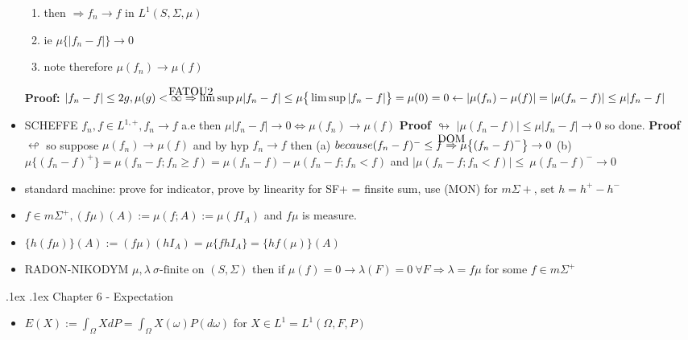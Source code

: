 \documentclass[10pt,landscape,a4paper]{article}
\makeatletter
\renewcommand{\section}{\@startsection{section}{1}{0mm}%
                                {.1ex}%
                                {.1ex}%
                                {\color{blue}\sffamily\small\bfseries}}
\newcommand\myright[1]{\stackrel{\mathclap{\normalfont\mbox{#1}}}{ \Rightarrow }}
\newcommand{\myblp}{ \big \{ }
\newcommand{\mybrp}{ \big \} }
\makeatother
\begin{document}
\begin{multicols*}{3}
\begin{spacing}{0.5}
\begin{itemize}
\begin{enumerate}
\item then  $\Rightarrow f_n \rightarrow f \text{ in } L^1 (S,\Sigma,\mu) $ 
\item ie $\mu \big \{ |f_n - f| \big \} \rightarrow 0$ 
\item  note therefore $\mu(f_n) \rightarrow \mu(f)  $  
\end{enumerate}

\textbf{Proof:} $|f_n - f| \le 2g , \mu(g) < \infty \myright{FATOU2} \limsup \mu |f_n -f| \le \mu \big \{ \limsup |f_n -f| \big \} = \mu(0) = 0 \leftarrow |\mu(f_n) -\mu(f)| = | \mu(f_n-f)| \le \mu |f_n -f| $ 

\item  \colorbox{red!10}{SCHEFFE} $ f_n,f \in L^{1,+}, f_n \rightarrow f$ a.e then $\mu |f_n-f| \rightarrow 0  \Leftrightarrow \mu(f_n) \rightarrow \mu(f)$ \textbf{Proof $\looparrowright$} $ |\mu(f_n-f)| \le \mu|f_n-f| \rightarrow 0$ so done. \textbf{Proof} $\looparrowleft$ so suppose $\mu(f_n) \rightarrow \mu(f)$ and by hyp $f_n \rightarrow f$ then (a) $because (f_n-f)^- \le f \myright{DOM} \mu \big \{ {(f_n-f)}^- \big \}\rightarrow 0$ (b) \( \mu \myblp {(f_n-f) }^+ \mybrp = \mu  (f_n-f;f_n \ge f) = \mu(f_n-f) - \mu(f_n-f;f_n<f) \) and $  | \mu(f_n-f;f_n<f) | \le \ \mu{(f_n-f)}^- \rightarrow 0 $

\item standard machine: prove for indicator, prove by linearity  for SF+ = finsite sum, use (MON) for $m\Sigma+$, set $h=h^+ - h^-$

\item $ f \in m\Sigma^+, (f\mu)(A) := \mu(f;A) := \mu(fI_A)$ and $f\mu$ is  measure.
\item $\big \{ h(f\mu) \big \} (A) := (f\mu)(hI_A) =\mu \{ fhI_A \} = \big \{ hf(\mu) \big \} (A) $
\item \colorbox{red!10}{RADON-NIKODYM} $\mu,\lambda\ \sigma\text{-finite on } (S,\Sigma) $ then if $\mu(f)=0 \rightarrow \lambda(F)=0\ \forall F \Rightarrow \lambda = f\mu$ for some $f \in m\Sigma^+$

\end{itemize}

\section{Chapter 6 - Expectation}

\begin{itemize}
\item $E(X) := \int_{\Omega} XdP = \int_{\Omega} X(\omega) P(d\omega)$ for $X \in L^1=L^1(\Omega,F,P)$


\end{itemize}
\end{spacing}
\end{multicols*}
\end{document}
